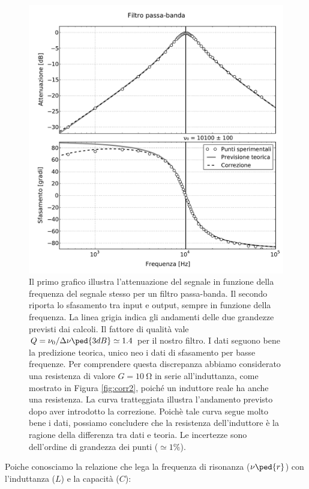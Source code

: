 \begin{figure}
  \includegraphics[scale=0.55]{passa_banda.pdf}
  \caption{Il primo grafico illustra l'attenuazione del segnale in funzione della frequenza del segnale stesso
    per un filtro passa-banda.
    Il secondo riporta lo sfasamento tra input e output, sempre in funzione della frequenza. La linea grigia indica
    gli andamenti delle due grandezze previsti dai calcoli. Il fattore di qualità vale
    $Q = \nu_0/\Delta \nu\ped{3dB} \simeq 1.4$ per il nostro filtro. I dati seguono bene la predizione teorica,
    unico neo i dati di sfasamento per basse frequenze. Per comprendere questa discrepanza abbiamo considerato una
    resistenza di valore $G = \SI{10}{\ohm}$ in serie all'induttanza, come mostrato in Figura \ref{fig:corr2},
    poiché un induttore reale ha anche una resistenza. La curva tratteggiata illustra l'andamento previsto dopo aver introdotto la
    correzione. Poichè tale curva segue molto bene i dati, possiamo concludere che la resistenza dell'induttore è
    la ragione della differenza tra dati e teoria.
    Le incertezze sono dell'ordine di grandezza dei punti ($\simeq 1\%$).}
  \label{fig:g_banda}
\end{figure}

Poiche conosciamo la relazione che lega la frequenza di risonanza ($\nu\ped{r}$) con l'induttanza ($L$) e la capacità ($C$):

